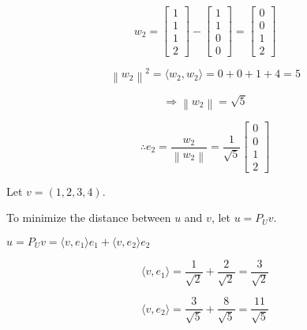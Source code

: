 \documentclass[fleqn]{article}
\newcommand{\norm}[1]{\left \lVert #1 \right \rVert}
\begin{document}
\begin{enumerate}[nolistsep]
		\begin{equation*}
			w_2 = \begin{bmatrix}1\\1\\1\\2\end{bmatrix} - \begin{bmatrix}1\\1\\0\\0\end{bmatrix} = \begin{bmatrix}0\\0\\1\\2\end{bmatrix}
		\end{equation*}
		
		\begin{equation*}
			\norm{w_2}^2 = \langle w_2, w_2 \rangle = 0 + 0 + 1 + 4 = 5
		\end{equation*}
		
		\begin{equation*}
			\Rightarrow \norm{w_2} = \sqrt{5} 
		\end{equation*}
		
		\begin{equation*}
			\therefore e_2 = \frac{w_2}{\norm{w_2}} = \frac{1}{\sqrt{5}}\begin{bmatrix}0\\0\\1\\2\end{bmatrix}
		\end{equation*}
		
		Let $v = (1,2,3,4)$.
		
		To minimize the distance between $u$ and $v$, let $u = P_{U}v$.
		
		$u = P_{U}v = \langle v, e_1 \rangle e_1 + \langle v, e_2 \rangle e_2$
		
		\begin{equation*}
			\langle v, e_1 \rangle = \frac{1}{\sqrt{2}} + \frac{2}{\sqrt{2}} = \frac{3}{\sqrt{2}}
		\end{equation*}
		
		\begin{equation*}
			\langle v, e_2 \rangle = \frac{3}{\sqrt{5}} + \frac{8}{\sqrt{5}} = \frac{11}{\sqrt{5}}
		\end{equation*}
		

\end{enumerate}
\end{document}
